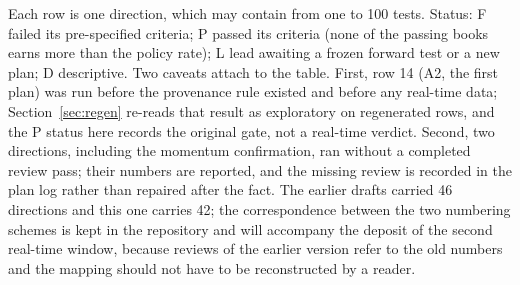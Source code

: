 Each row is one direction, which may contain from one to 100 tests. Status: F failed its pre-specified criteria; P passed its criteria (none of the passing books earns more than the policy rate); L lead awaiting a frozen forward test or a new plan; D descriptive. Two caveats attach to the table. First, row 14 (A2, the first plan) was run before the provenance rule existed and before any real-time data; Section~\ref{sec:regen} re-reads that result as exploratory on regenerated rows, and the P status here records the original gate, not a real-time verdict. Second, two directions, including the momentum confirmation, ran without a completed review pass; their numbers are reported, and the missing review is recorded in the plan log rather than repaired after the fact. The earlier drafts carried 46 directions and this one carries 42; the correspondence between the two numbering schemes is kept in the repository and will accompany the deposit of the second real-time window, because reviews of the earlier version refer to the old numbers and the mapping should not have to be reconstructed by a reader.

